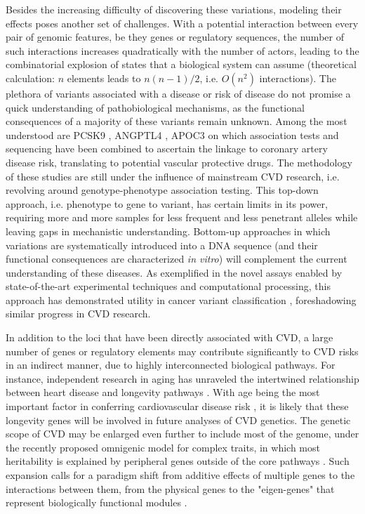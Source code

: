 \documentclass[letter]{bib}
\begin{document}
Besides the increasing difficulty of discovering these variations, modeling their effects poses another set of challenges. With a potential interaction between every pair of genomic features, be they genes or regulatory sequences, the number of such interactions increases quadratically with the number of actors, leading to the combinatorial explosion of states that a biological system can assume (theoretical calculation: $n$ elements leads to $n(n-1)/2$, i.e. $O(n^2)$ interactions).  The plethora of variants associated with a disease or risk of disease do not promise a quick understanding of pathobiological mechanisms, as the functional consequences of a majority of these variants remain unknown. Among the most understood are PCSK9 \citep{Cohen:2006:Sequence}, ANGPTL4 \citep{Dewey:2016:Inactivating,CARDIoGRAM:2016:Coding}, APOC3 \citep{NHLBI:2014:LossofFunction} on which association tests and sequencing have been combined to ascertain the linkage to coronary artery disease risk, translating to potential vascular protective drugs. The methodology of these studies are still under the influence of mainstream CVD research, i.e. revolving around genotype-phenotype association testing. This top-down approach, i.e. phenotype to gene to variant, has certain limits in its power, requiring more and more samples for less frequent and less penetrant alleles while leaving gaps in mechanistic understanding. Bottom-up approaches in which variations are systematically introduced into a DNA sequence (and their functional consequences are characterized \textit{in vitro}) will complement the current understanding of these diseases. As exemplified in the novel assays enabled by state-of-the-art experimental techniques and computational processing, this approach has demonstrated utility in cancer variant classification \citep{Findlay:2018:Accurate}, foreshadowing similar progress in CVD research.

In addition to the loci that have been directly associated with CVD, a large number of genes or regulatory elements may contribute significantly to CVD risks in an indirect manner, due to highly interconnected biological pathways.  For instance, independent research in aging has unraveled the intertwined relationship between heart disease and longevity pathways \citep{North:2012:Intersection}.  With age being the most important factor in conferring cardiovascular disease risk \citep{Steenman:2017:Cardiac}, it is likely that these longevity genes will be involved in future analyses of CVD genetics. The genetic scope of CVD may be enlarged even further to include most of the genome, under the recently proposed omnigenic model for complex traits, in which most heritability is explained by peripheral genes outside of the core pathways \citep{Boyle:2017:Expanded}. Such expansion calls for a paradigm shift from additive effects of multiple genes to the interactions between them, from the physical genes to the "eigen-genes" that represent biologically functional modules \citep{Weiss:2012:Good}.
	
\end{document}
